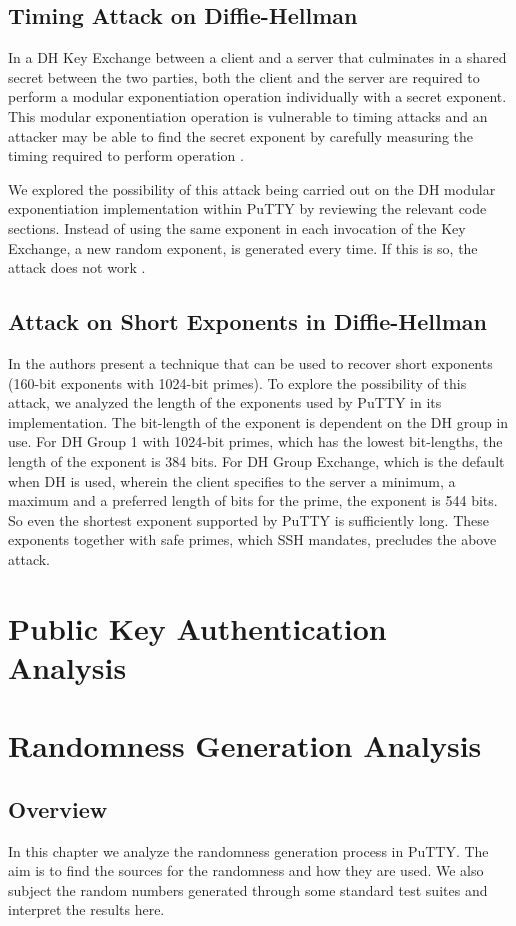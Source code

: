 \documentclass{report}
\begin{document}
\section{Timing Attack on Diffie-Hellman}
In a DH Key Exchange between a client and a server that culminates in a shared secret between the two parties, both the client and the server are required to perform a modular exponentiation operation individually with a secret exponent. This modular exponentiation operation is vulnerable to timing attacks and an attacker may be able to find the secret exponent by carefully measuring the timing required to perform operation \cite{kocher96}.\par
We explored the possibility of this attack being carried out on the DH modular exponentiation implementation within PuTTY by reviewing the relevant code sections. Instead of using the same exponent in each invocation of the Key Exchange, a new random exponent, is generated every time. If this is so, the attack does not work \cite{kocher96}.\par
\section{Attack on Short Exponents in Diffie-Hellman}
In \cite{oorschot96} the authors present a technique that can be used to recover short exponents (160-bit exponents with 1024-bit primes). To explore the possibility of this attack, we analyzed the length of the exponents used by PuTTY in its implementation. The bit-length of the exponent is dependent on the DH group in use. For DH Group 1 with 1024-bit primes, which has the lowest bit-lengths, the length of the exponent is 384 bits. For DH Group Exchange, which is the default when DH is used, wherein the client specifies to the server a minimum, a maximum and a preferred length of bits for the prime, the exponent is 544 bits. So even the shortest exponent supported by PuTTY is sufficiently long. These exponents together with safe primes, which SSH mandates, precludes the above attack.
\chapter{Public Key Authentication Analysis}
\chapter{Randomness Generation Analysis}
\section{Overview}
In this chapter we analyze the randomness generation process in PuTTY. The aim is to find the sources for the randomness and how they are used. We also subject the random numbers generated through some standard test suites and interpret the results here.
\end{document}
